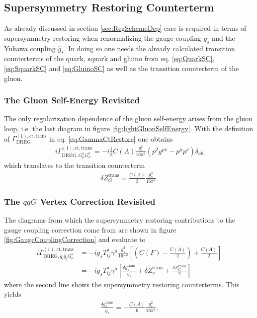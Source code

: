 \subsection{Supersymmetry Restoring Counterterm}\label{sec:SUSYrestore}
As already discussed in section \ref{sec:RegSchemeDep} care is required in terms of supersymmetry restoring when renormalizing  the gauge coupling $g_s$ and the Yukawa coupling $\hat{g}_s$. In doing so one needs the already calculated transition counterterms of the quark, squark and gluino from eq. \ref{eq:QuarkSC}, \ref{eq:SquarkSC} and \ref{eq:GluinoSC}
as well as the transition counterterm of the gluon.
\subsubsection*{The Gluon Self-Energy Revisited}
The only regularization dependence of the gluon self-energy arises from the gluon loop, i.e. the last diagram in figure \ref{fig:lightGluonSelfEnergy}. With the definition of $\Gamma^{\mathrm{(1),ct,trans}}_{\mathrm{DREG}}$ in eq. \ref{eq:GammaCtRestore} one obtains
\begin{align}
i\Gamma^{\mathrm{(1),ct,trans}}_{\mathrm{DREG},G_\mu^a G_\nu^b} = -i\frac{1}{3} C(A) \frac{g_s^2}{16\pi^2}(p^2 g^{\mu\nu}-p^\mu p^\nu)\delta_{ab}
\end{align}
which translates to the transition counterterm
\begin{align}
\delta Z^{\mathrm{trans}}_G = \frac{C(A)}{3}\frac{g_s^2}{16\pi^2}.
\end{align}

\subsubsection*{The $q\overline{q}G$ Vertex Correction Revisited}
The diagrams from which the supersymmetry restoring contributions to the gauge coupling correction come from are shown in figure \ref{fig:GaugeCouplingCorrection} and evaluate to
\begin{align}
i\Gamma^{\mathrm{(1),ct,trans}}_{\mathrm{DREG}, q_i\overline{q}_jG_\mu^a} &= -ig_s T^a_{ij} \gamma^\mu \frac{g_s^2}{16\pi^2}\left[ \left( C(F) - \frac{C(A)}{2} \right) + \frac{C(A)}{2} \right]\\
&= -ig_s T^a_{ij} \gamma^\mu \left[ \frac{\delta g_s^{\mathrm{trans}}}{g_s} + \delta Z^{\mathrm{trans}}_q + \frac{\delta Z^{\mathrm{trans}}_G}{2} \right]
\end{align}
where the second line shows the supersymmetry restoring counterterms. This yields
\begin{align}
\frac{\delta g_s^{\mathrm{trans}}}{g_s} = -\frac{C(A)}{6} \frac{g_s^2}{16\pi^2}.
\end{align}

